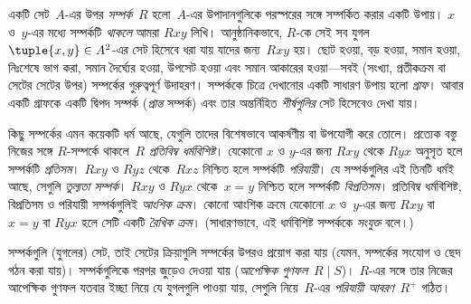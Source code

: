 একটি সেট~$A$-এর উপর \emph{সম্পর্ক}~$R$ হলো~$A$-এর
উপাদানগুলিকে পরস্পরের সঙ্গে সম্পর্কিত করার একটি উপায়। $x$ ও~$y$-এর মধ্যে
সম্পর্কটি \emph{থাকলে} আমরা $Rxy$ লিখি। আনুষ্ঠানিকভাবে, $R$-কে
সেই সব যুগল $\tuple{x,y} \in A^2$-এর সেট হিসেবে ধরা যায় যাদের
জন্য~$Rxy$ হয়। ছোট হওয়া, বড় হওয়া, সমান হওয়া, নিঃশেষে ভাগ করা,
সমান দৈর্ঘ্যের হওয়া, উপসেট হওয়া এবং সমান আকারের হওয়া—সবই
(সংখ্যা, প্রতীকক্রম বা সেটের সেটের উপর) সম্পর্কের গুরুত্বপূর্ণ
উদাহরণ। সম্পর্ককে চিত্রে দেখানোর একটি সাধারণ উপায় হলো \emph{গ্রাফ}।
আবার একটি গ্রাফকে একটি দ্বিপদ সম্পর্ক (\emph{প্রান্ত} সম্পর্ক) এবং
তার অন্তর্নিহিত \emph{শীর্ষগুলির} সেট হিসেবেও দেখা যায়।

কিছু সম্পর্কের এমন কয়েকটি ধর্ম আছে, যেগুলি তাদের বিশেষভাবে
আকর্ষণীয় বা উপযোগী করে তোলে। প্রত্যেক বস্তু নিজের সঙ্গে
$R$-সম্পর্কে থাকলে~$R$ \emph{প্রতিবিম্ব ধর্মবিশিষ্ট}। যেকোনো $x$ ও
$y$-এর জন্য $Rxy$ থেকে $Ryx$ অনুসৃত হলে সম্পর্কটি \emph{প্রতিসম}।
$Rxy$ ও $Ryz$ থেকে~$Rxz$ নিশ্চিত হলে সম্পর্কটি \emph{পরিযায়ী}।
যে সম্পর্কগুলির এই তিনটি ধর্মই আছে, সেগুলি \emph{তুল্যতা সম্পর্ক}।
$Rxy$ ও $Ryx$ থেকে~$x=y$ নিশ্চিত হলে সম্পর্কটি \emph{বিপ্রতিসম}।
প্রতিবিম্ব ধর্মবিশিষ্ট, বিপ্রতিসম ও পরিযায়ী সম্পর্কগুলিই
\emph{আংশিক ক্রম}। কোনো আংশিক ক্রমে যেকোনো $x$ ও~$y$-এর জন্য
$Rxy$ বা $x=y$ বা $Ryx$ হলে সেটি একটি \emph{রৈখিক ক্রম}।
(সাধারণভাবে, এই ধর্মবিশিষ্ট সম্পর্ককে \emph{সংযুক্ত} বলে।)

সম্পর্কগুলি (যুগলের) সেট, তাই সেটের ক্রিয়াগুলি সম্পর্কের উপরও
প্রয়োগ করা যায় (যেমন, সম্পর্কের সংযোগ ও ছেদ গঠন করা যায়)।
সম্পর্কগুলিকে পরপর জুড়েও দেওয়া যায় (\emph{আপেক্ষিক গুণফল}~$R \mid S$)।
$R$-এর সঙ্গে তার নিজের আপেক্ষিক গুণফল যতবার ইচ্ছা নিয়ে যে
যুগলগুলি পাওয়া যায়, সেগুলি নিয়ে~$R$-এর \emph{পরিযায়ী আবরণ}~$R^+$ গঠিত।
